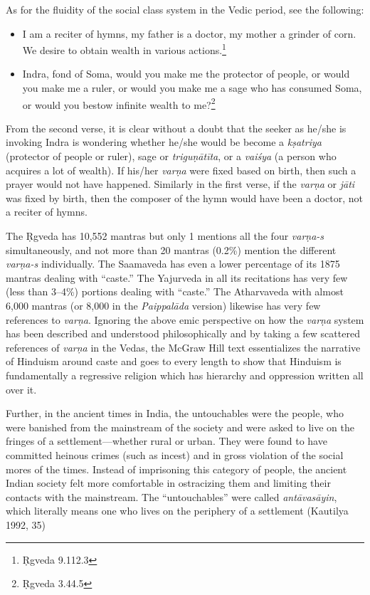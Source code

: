 As for the fluidity of the social class system in the Vedic period, see the following:

\begin{itemize} 
\item I am a reciter of hymns, my father is a doctor, my mother a grinder of corn. We desire to obtain wealth in various actions.\footnote{Ṛgveda 9.112.3}
\item Indra, fond of Soma, would you make me the protector of people, or would you make me a ruler, or would you make me a sage who has consumed Soma, or would you bestow infinite wealth to me?\footnote{Ṛgveda 3.44.5} 
\end{itemize}

From the second verse, it is clear without a doubt that the seeker as he/she is invoking Indra is wondering whether he/she would be become a \textit{kṣatriya} (protector of people or ruler), sage or \textit{triguṇātīta},  or a \textit{vaiśya} (a person who acquires a lot of wealth). If his/her \textit{varṇa} were fixed based on birth, then such a prayer would not have happened. Similarly in the first verse, if the \textit{varṇa} or \textit{jāti} was fixed by birth, then the composer of the hymn would have been a doctor, not a reciter of hymns. 

The Ṛgveda has 10,552 mantras but only 1 mentions all the four \textit{varṇa-s} simultaneously, and not more than 20 mantras (0.2\%) mention the different \textit{varṇa-s} individually. The Saamaveda has even a lower percentage of its 1875 mantras dealing with “caste.” The Yajurveda in all its recitations has very few (less than 3--4\%) portions dealing with “caste.” The Atharvaveda with almost 6,000 mantras (or 8,000 in the \textit{Paippalāda} version) likewise has very few references to \textit{varṇa}. Ignoring the above emic perspective on how the \textit{varṇa} system has been described and understood philosophically and by taking a few scattered references of \textit{varṇa} in the Vedas, the McGraw Hill text essentializes the narrative of Hinduism around caste and goes to every length to show that Hinduism is fundamentally a regressive religion which has hierarchy and oppression written all over it. 

Further, in the ancient times in India, the untouchables were the people, who were banished from the mainstream of the society and were asked to live on the fringes of a settlement—whether rural or urban. They were found to have committed heinous crimes (such as incest) and in gross violation of the social mores of the times. Instead of imprisoning this category of people, the ancient Indian society felt more comfortable in ostracizing them and limiting their contacts with the mainstream. The “untouchables” were called \textit{antāvasāyin},  which literally means one who lives on the periphery of a settlement (Kautilya 1992, 35)

